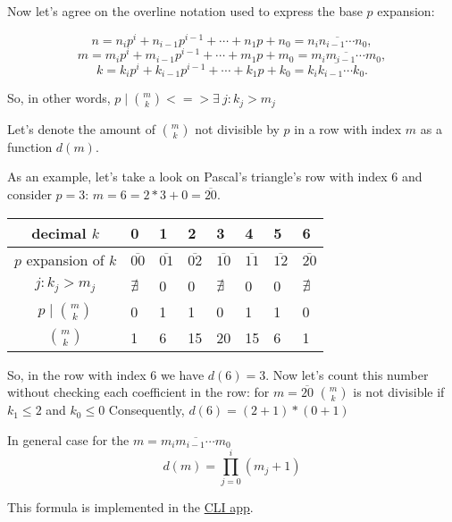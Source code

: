 \documentclass[12pt]{article}
\begin{document}
\bigskip

Now let's agree on the overline notation used to express the base $p$ 
expansion:

$$n=n_ip^i+n_{i-1}p^{i-1}+\cdots +n_1p+n_0 = \overline{n_in_{i-1} \cdots n_0},$$
$$m=m_ip^i+m_{i-1}p^{i-1}+\cdots +m_1p+m_0 = \overline{m_im_{i-1} \cdots m_0},$$
$$k=k_ip^i+k_{i-1}p^{i-1}+\cdots +k_1p+k_0 = \overline{k_ik_{i-1} \cdots k_0}.$$

\bigskip

So, in other words, $p \mid \binom m k <=> \exists \: j: k_j > m_j$
\bigskip

Let's denote the amount of $\binom m k$ not divisible by $p$ in a row with 
index $m$ as a function $d(m).$ 

\bigskip

As an example, let's take a look on Pascal's triangle's row with index 6 and 
consider $p = 3$: $m = 6 = 2*3 + 0 = \overline{20}$.


\begin{table}[!h]
  \centering
  \renewcommand{\arraystretch}{1.4}%
  \begin{tabular}{|c|m{1em}|m{1em}|m{1em}|m{1em}|m{1em}|m{1em}|m{1em}|}
    \hline
    decimal $k$ & 0 & 1 & 2 & 3 & 4 & 5 & 6 \\
    \hline
    $p$ expansion of $k$ & $\overline{00}$ & $\overline{01}$ & $\overline{02}$ & 
    $\overline{10}$ & $\overline{11}$ & $\overline{12}$ & 
    $\overline{20}$ \\
    \hline
    $j: k_j > m_j$ & $\nexists$ & 0 & 0 & $\nexists$ & 0 & 0 & $\nexists$ \\
    \hline
    $p \mid \binom m k$ & 0 & 1 & 1 & 0 & 1 & 1 & 0 \\
    \hline
    $\binom m k$ & 1 & 6 & 15 & 20 & 15 & 6 & 1 \\
    \hline
  \end{tabular}
\end{table}

So, in the row with index 6 we have $d(6) = 3$.
Now let's count this number without checking each coefficient in the row: for 
$m = \overline{20}$ $\binom m k$ is not divisible if $k_1 \le 2$ and $k_0 \le 0$
Consequently, $d(6) = (2 + 1) * (0 + 1)$

\bigskip

In general case for the $m = \overline{m_im_{i-1} \cdots m_0}$ 
$$d(m) = {\displaystyle \prod_{j=0}^{i} (m_j + 1)}$$

\bigskip

This formula is implemented in the 
\href{https://github.com/DenisMaley/pascal-triangle}{CLI app}.

\bigskip
\end{document}
